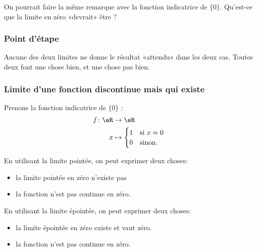 On pourrait faire la même remarque avec la fonction indicatrice de \( \{ 0 \}\). Qu'est-ce que la limite en zéro «devrait» être ?

\subsubsection{Point d'étape}

Aucune des deux limites ne donne le résultat «attendu» dans les deux cas. Toutes deux font une chose bien, et une chose pas bien.

\subsubsection{Limite d'une fonction discontinue mais qui existe}

Prenons la fonction indicatrice de \( \{ 0 \}\) :
\begin{equation}
	\begin{aligned}
		f\colon\eR & \to \eR                    \\
		x          & \mapsto \begin{cases}
			                     1 & \text{si } x=0 \\
			                     0 & \text{sinon. }
		                     \end{cases}
	\end{aligned}
\end{equation}

En utilisant la limite pointée, on peut exprimer deux choses:
\begin{itemize}
	\item la limite pointée en zéro n'existe pas
	\item la fonction n'est pas continue en zéro.
\end{itemize}

En utilisant la limite épointée, on peut exprimer deux choses:
\begin{itemize}
	\item la limite épointée en zéro existe et vaut zéro.
	\item la fonction n'est pas continue en zéro.
\end{itemize}

